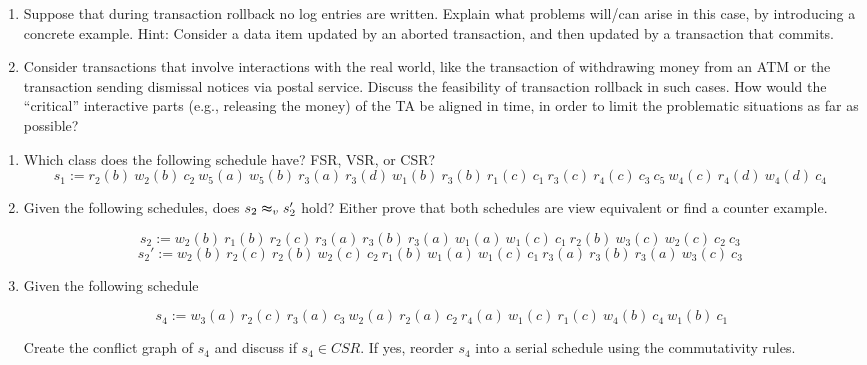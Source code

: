\newpage


\begin{enumerate}
  \item Suppose that during transaction rollback no log entries are written.
        Explain what problems will/can arise in this case, by introducing a concrete example.
        Hint: Consider a data item updated by an aborted transaction, and then updated by a transaction that commits.

  \item Consider transactions that involve interactions with the real world, like the transaction of withdrawing money from an ATM or the transaction sending dismissal notices via  postal service.
        Discuss the feasibility of transaction rollback in such cases.
        How would the ``critical'' interactive parts (e.g., releasing the money) of the TA be aligned in time, in order to limit the problematic situations as far as possible?

\end{enumerate}


\begin{enumerate}
  \item Which class does the following schedule have? FSR, VSR, or CSR?
        $$s_1 := r_2(b)\ w_2(b)\ c_2\ w_5(a)\ w_5(b)\ r_3(a)\ r_3(d)\ w_1(b)\ r_3(b)\ r_1(c)\ c_1\ r_3(c)\ r_4(c)\ c_3\ c_5\ w_4(c)\ r_4(d)\ w_4(d)\ c_4\ $$

  \item Given the following schedules, does $s_2 \thickapprox_v s_2'$ hold? Either prove that both schedules are view equivalent or find a counter example.

        $$s_2 := w_2(b)\ r_1(b)\ r_2(c)\ r_3(a)\ r_3(b)\ r_3(a)\ w_1(a)\ w_1(c)\ c_1\ r_2(b)\ w_3(c)\ w_2(c)\ c_2\ c_3\ $$
        $$s_2':= w_2(b)\ r_2(c)\ r_2(b)\ w_2(c)\ c_2\ r_1(b)\  w_1(a)\ w_1(c)\ c_1\ r_3(a)\ r_3(b)\ r_3(a)\ w_3(c)\ c_3\ $$

  \item Given the following schedule

        $$s_4 := w_3(a)\ r_2(c)\ r_3(a)\ c_3\ w_2(a)\ r_2(a)\ c_2\ r_4(a)\ w_1(c)\ r_1(c)\ w_4(b)\ c_4\ w_1(b)\ c_1$$

        Create the conflict graph of $s_4$ and discuss if $s_4 \in CSR$.
        If yes, reorder $s_4$ into a serial schedule using the commutativity rules.

\end{enumerate}


